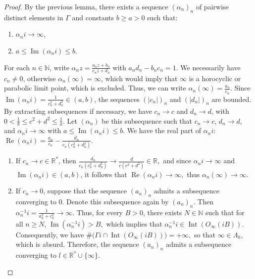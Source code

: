 \documentclass[11pt]{amsart}
\begin{document}
\begin{proof}
By the previous lemma, there exists a sequence \((\alpha_n)_n\) of pairwise distinct elements in \(\Gamma\) and constants \(b \geq a > 0\) such that:  
\begin{enumerate}
    \item \(\alpha_n i \to \infty\),
    \item \(a \leq \operatorname{Im}(\alpha_n i) \leq b\).
\end{enumerate}

For each \(n \in \mathbb{N}\), write  
$
\alpha_n z = \frac{a_n z + b_n}{c_n z + d_n}
$
with \(a_n d_n - b_n c_n = 1\).  
We necessarily have \(c_n \neq 0\), otherwise \(\alpha_n(\infty) = \infty\), which would imply that \(\infty\) is a horocyclic or parabolic limit point, which is excluded.  
Thus, we can write  
$
\alpha_n(\infty) = \frac{a_n}{c_n}.
$
Since \( \operatorname{Im}(\alpha_n i) = \frac{1}{c_n^2 + d_n^2} \in (a,b) \), the sequences \((|c_n|)_n\) and \((|d_n|)_n\) are bounded.  
By extracting subsequences if necessary, we have \(c_n \to c\) and \(d_n \to d\), with  
$
0 < \frac{1}{b} \leq c^2 + d^2 \leq \frac{1}{a}.
$  
Let \((\alpha_n)\) be this subsequence such that \(c_n \to c\), \(d_n \to d\), and \(\alpha_n i \to \infty\) with \(a \leq \operatorname{Im}(\alpha_n i) \leq b\).  
We have the real part of \(\alpha_n i\):  
$
\operatorname{Re}(\alpha_n i) = \frac{a_n}{c_n} - \frac{d_n}{c_n (c_n^2 + d_n^2)}.
$
\begin{enumerate}
    \item If \(c_n \to c \in \mathbb{R}^*\), then  
    $
    \frac{d_n}{c_n (c_n^2 + d_n^2)} \to \frac{d}{c(c^2 + d^2)} \in \mathbb{R},
    $
    and since \(\alpha_n i \to \infty\) and \(\operatorname{Im}(\alpha_n i) \in (a,b)\), it follows that  
    $
    \operatorname{Re}(\alpha_n i) \to \infty,
    $
    thus \(\alpha_n(\infty) \to \infty\).
    
    \item If \(c_n \to 0\),  
    suppose that the sequence \((a_n)_n\) admits a subsequence converging to 0. Denote this subsequence again by \((a_n)_n\). Then  
    $
    \alpha_n^{-1} i = \frac{1}{a_n^2 + c_n^2} \to \infty.
    $
    Thus, for every \( B > 0 \), there exists \( N \in \mathbb{N} \) such that for all \( n \geq N \),  
$
\operatorname{Im}(\alpha_n^{-1} i) > B,
$  
which implies that  
$
\alpha_n^{-1} i \in \operatorname{Int}(O_{\infty}(iB)).
$  
Consequently, we have  
$\# \big(\Gamma i \cap \operatorname{Int}(O_{\infty}(iB))\big) = +\infty,
$  
so that \(\infty \in \Lambda_h\), which is absurd. Therefore, the sequence \((a_n)_n\) admits a subsequence converging to \( l \in \mathbb{R}^* \cup \{\infty\} \).
\end{enumerate}

\end{proof}
\end{document}
